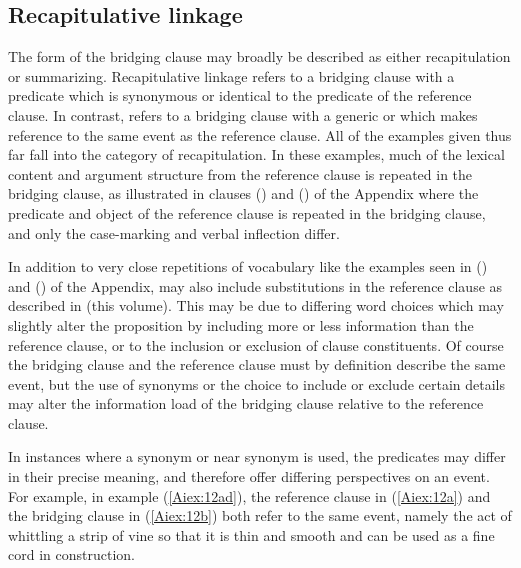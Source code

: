 \documentclass[output=paper]{LSP/langsci}
\begin{document}
\subsection{Recapitulative linkage} 
\label{AiRecapitulative}
The form of the bridging clause may broadly be described as either recapitulation or summarizing. Recapitulative linkage refers to a bridging clause with a predicate which is synonymous or identical to the predicate of the reference clause. In contrast,  refers to a bridging clause with a generic or  which makes reference to the same event as the reference clause. All of the examples given thus far fall into the category of recapitulation. In these examples, much of the lexical content and argument structure from the reference clause is repeated in the bridging clause, as illustrated in clauses () and () of the Appendix where the predicate and object of the reference clause is repeated in the bridging clause, and only the case-marking and verbal inflection differ.

In addition to very close repetitions of vocabulary like the examples seen in () and () of the Appendix,  may also include substitutions in the reference clause as described in \citeauthor{guerin18} (this volume). This may be due to differing word choices which may slightly alter the proposition by including more or less information than the reference clause, or to the inclusion or exclusion of clause constituents. Of course the bridging clause and the reference clause must by definition describe the same event, but the use of synonyms or the choice to include or exclude certain details may alter the information load of the bridging clause relative to the reference clause.

In instances where a synonym or near synonym is used, the predicates may differ in their precise meaning, and therefore offer differing perspectives on an event. For example, in example (\ref{Aiex:12ad}), the reference clause in (\ref{Aiex:12a}) and the bridging clause in (\ref{Aiex:12b}) both refer to the same event, namely the act of whittling a strip of vine so that it is thin and smooth and can be used as a fine cord in construction.
\end{document}
